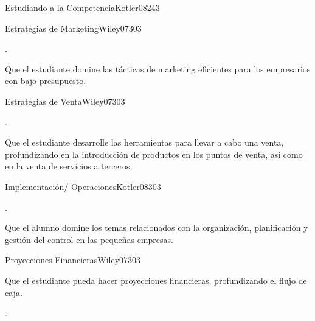 \begin{syllabus}
\begin{unit}{Estudiando a la Competencia}{}{Kotler08}{24}{3}
\end{unit}

\begin{unit}{Estrategias de Marketing}{}{Wiley07}{30}{3}
   \begin{topics}
      \item . 
   \end{topics}

   \begin{learningoutcomes}
      \item Que el estudiante domine las tácticas de marketing eficientes para los empresarios con bajo presupuesto.
   \end{learningoutcomes}
\end{unit}

\begin{unit}{Estrategias de Venta}{}{Wiley07}{30}{3}
   \begin{topics}
      \item .
   \end{topics}

   \begin{learningoutcomes}
      \item Que el estudiante desarrolle las herramientas para llevar a cabo una venta, profundizando en la introducción de productos en los puntos de venta, así como en la venta de servicios a terceros.
   \end{learningoutcomes}
\end{unit}

\begin{unit}{Implementación/ Operaciones}{}{Kotler08}{30}{3}
   \begin{topics}
      \item . 
   \end{topics}

   \begin{learningoutcomes}
      \item Que el alumno domine los temas relacionados con la organización, planificación y gestión del control en las pequeñas empresas.
   \end{learningoutcomes}

\end{unit}

\begin{unit}{Proyecciones Financieras}{}{Wiley07}{30}{3}
   \begin{topics}
      \item Que el estudiante pueda hacer proyecciones financieras, profundizando el flujo de caja.
   \end{topics}

   \begin{learningoutcomes}
      \item .
   \end{learningoutcomes}
\end{unit}

\begin{coursebibliography}
\end{coursebibliography}

\end{syllabus}
